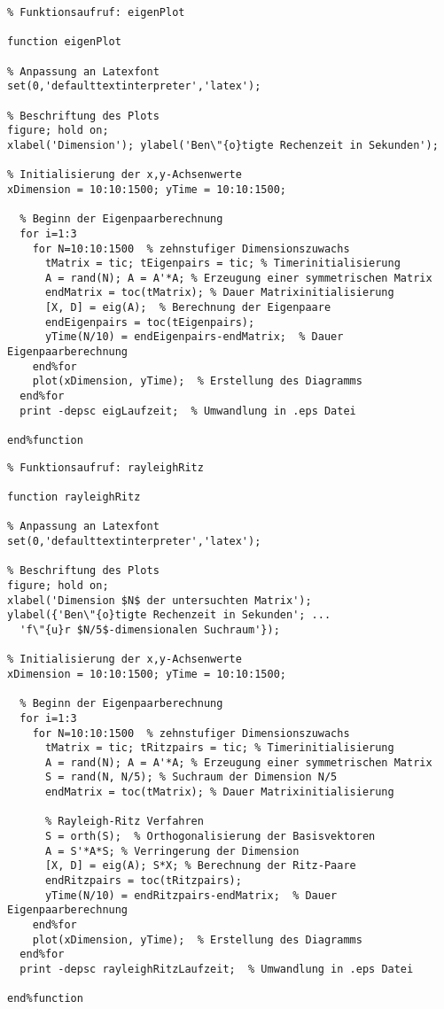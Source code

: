 \begin{lstlisting}[caption=Eigenpaarberechnung mit Zeiterfassung, captionpos=b, label=alg:appAlgorithm:eigenPlot]
% Eingabe: -; Ausgabe: -
% Funktionsaufruf: eigenPlot

function eigenPlot

% Anpassung an Latexfont
set(0,'defaulttextinterpreter','latex');

% Beschriftung des Plots
figure; hold on;
xlabel('Dimension'); ylabel('Ben\"{o}tigte Rechenzeit in Sekunden');

% Initialisierung der x,y-Achsenwerte
xDimension = 10:10:1500; yTime = 10:10:1500;

  % Beginn der Eigenpaarberechnung
  for i=1:3
    for N=10:10:1500  % zehnstufiger Dimensionszuwachs
      tMatrix = tic; tEigenpairs = tic; % Timerinitialisierung
      A = rand(N); A = A'*A; % Erzeugung einer symmetrischen Matrix
      endMatrix = toc(tMatrix); % Dauer Matrixinitialisierung
      [X, D] = eig(A);  % Berechnung der Eigenpaare
      endEigenpairs = toc(tEigenpairs);
      yTime(N/10) = endEigenpairs-endMatrix;  % Dauer Eigenpaarberechnung
    end%for
    plot(xDimension, yTime);  % Erstellung des Diagramms
  end%for
  print -depsc eigLaufzeit;  % Umwandlung in .eps Datei

end%function
\end{lstlisting}

\newpage
\begin{lstlisting}[caption=Rayleigh-Ritz Verfahren mit Zeiterfassung, captionpos=b, label=alg:appAlgorithm:rayleighRitz]
% Eingabe: -; Ausgabe: -
% Funktionsaufruf: rayleighRitz

function rayleighRitz

% Anpassung an Latexfont
set(0,'defaulttextinterpreter','latex');

% Beschriftung des Plots
figure; hold on;
xlabel('Dimension $N$ der untersuchten Matrix');
ylabel({'Ben\"{o}tigte Rechenzeit in Sekunden'; ...
  'f\"{u}r $N/5$-dimensionalen Suchraum'});

% Initialisierung der x,y-Achsenwerte
xDimension = 10:10:1500; yTime = 10:10:1500;

  % Beginn der Eigenpaarberechnung
  for i=1:3
    for N=10:10:1500  % zehnstufiger Dimensionszuwachs
      tMatrix = tic; tRitzpairs = tic; % Timerinitialisierung
      A = rand(N); A = A'*A; % Erzeugung einer symmetrischen Matrix
      S = rand(N, N/5); % Suchraum der Dimension N/5
      endMatrix = toc(tMatrix); % Dauer Matrixinitialisierung

      % Rayleigh-Ritz Verfahren
      S = orth(S);  % Orthogonalisierung der Basisvektoren
      A = S'*A*S; % Verringerung der Dimension
      [X, D] = eig(A); S*X; % Berechnung der Ritz-Paare
      endRitzpairs = toc(tRitzpairs);
      yTime(N/10) = endRitzpairs-endMatrix;  % Dauer Eigenpaarberechnung
    end%for
    plot(xDimension, yTime);  % Erstellung des Diagramms
  end%for
  print -depsc rayleighRitzLaufzeit;  % Umwandlung in .eps Datei

end%function
\end{lstlisting}

